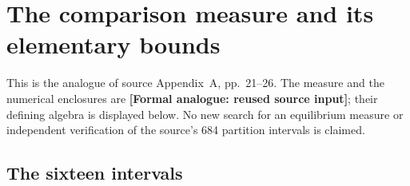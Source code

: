 \section{The comparison measure and its elementary bounds}
\label{appa-measure}

This is the analogue of source Appendix~A, pp.~21--26.  The measure and
the numerical enclosures are \textbf{[Formal analogue: reused source
input]}; their defining algebra is displayed below.  No new search for
an equilibrium measure or independent verification of the source's
684 partition intervals is claimed.

\subsection{The sixteen intervals}


